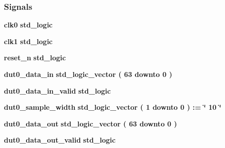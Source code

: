 \subsubsection*{Signals}
 \begin{DoxyCompactItemize}
\item 
{\bf clk0} {\bfseries \textcolor{comment}{std\+\_\+logic}\textcolor{vhdlchar}{ }} 
\item 
{\bf clk1} {\bfseries \textcolor{comment}{std\+\_\+logic}\textcolor{vhdlchar}{ }} 
\item 
{\bf reset\+\_\+n} {\bfseries \textcolor{comment}{std\+\_\+logic}\textcolor{vhdlchar}{ }} 
\item 
{\bf dut0\+\_\+data\+\_\+in} {\bfseries \textcolor{comment}{std\+\_\+logic\+\_\+vector}\textcolor{vhdlchar}{ }\textcolor{vhdlchar}{(}\textcolor{vhdlchar}{ }\textcolor{vhdlchar}{ } \textcolor{vhdldigit}{63} \textcolor{vhdlchar}{ }\textcolor{keywordflow}{downto}\textcolor{vhdlchar}{ }\textcolor{vhdlchar}{ } \textcolor{vhdldigit}{0} \textcolor{vhdlchar}{ }\textcolor{vhdlchar}{)}\textcolor{vhdlchar}{ }} 
\item 
{\bf dut0\+\_\+data\+\_\+in\+\_\+valid} {\bfseries \textcolor{comment}{std\+\_\+logic}\textcolor{vhdlchar}{ }} 
\item 
{\bf dut0\+\_\+sample\+\_\+width} {\bfseries \textcolor{comment}{std\+\_\+logic\+\_\+vector}\textcolor{vhdlchar}{ }\textcolor{vhdlchar}{(}\textcolor{vhdlchar}{ }\textcolor{vhdlchar}{ } \textcolor{vhdldigit}{1} \textcolor{vhdlchar}{ }\textcolor{keywordflow}{downto}\textcolor{vhdlchar}{ }\textcolor{vhdlchar}{ } \textcolor{vhdldigit}{0} \textcolor{vhdlchar}{ }\textcolor{vhdlchar}{)}\textcolor{vhdlchar}{ }\textcolor{vhdlchar}{ }\textcolor{vhdlchar}{ }\textcolor{vhdlchar}{\+:}\textcolor{vhdlchar}{=}\textcolor{vhdlchar}{ }\textcolor{vhdlchar}{ }\textcolor{vhdlchar}{ }\textcolor{vhdlchar}{ }\textcolor{keyword}{\char`\"{} 10 \char`\"{}}\textcolor{vhdlchar}{ }} 
\item 
{\bf dut0\+\_\+data\+\_\+out} {\bfseries \textcolor{comment}{std\+\_\+logic\+\_\+vector}\textcolor{vhdlchar}{ }\textcolor{vhdlchar}{(}\textcolor{vhdlchar}{ }\textcolor{vhdlchar}{ } \textcolor{vhdldigit}{63} \textcolor{vhdlchar}{ }\textcolor{keywordflow}{downto}\textcolor{vhdlchar}{ }\textcolor{vhdlchar}{ } \textcolor{vhdldigit}{0} \textcolor{vhdlchar}{ }\textcolor{vhdlchar}{)}\textcolor{vhdlchar}{ }} 
\item 
{\bf dut0\+\_\+data\+\_\+out\+\_\+valid} {\bfseries \textcolor{comment}{std\+\_\+logic}\textcolor{vhdlchar}{ }} 
\item 

\end{DoxyCompactItemize}
